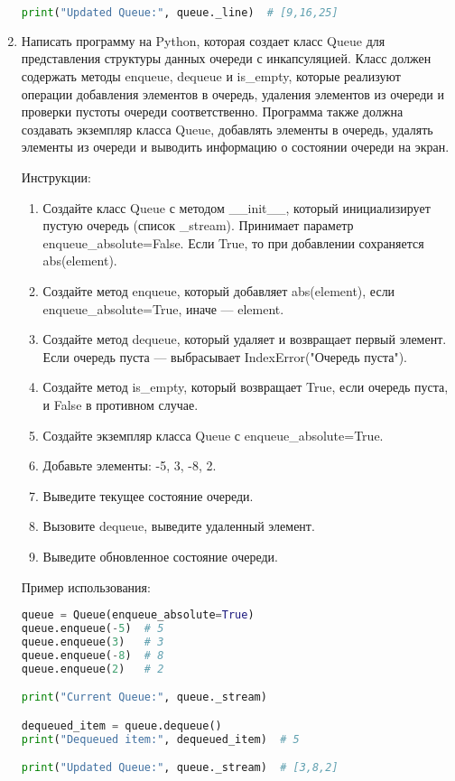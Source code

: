 \begin{enumerate}
\begin{lstlisting}[language=Python]
print("Updated Queue:", queue._line)  # [9,16,25]
\end{lstlisting}

\item Написать программу на Python, которая создает класс Queue для представления структуры данных очереди с инкапсуляцией. Класс должен содержать методы enqueue, dequeue и is\_empty, которые реализуют операции добавления элементов в очередь, удаления элементов из очереди и проверки пустоты очереди соответственно. Программа также должна создавать экземпляр класса Queue, добавлять элементы в очередь, удалять элементы из очереди и выводить информацию о состоянии очереди на экран.

Инструкции:
\begin{enumerate}
    \item Создайте класс Queue с методом \_\_init\_\_, который инициализирует пустую очередь (список \_stream). Принимает параметр enqueue\_absolute=False. Если True, то при добавлении сохраняется abs(element).
    \item Создайте метод enqueue, который добавляет abs(element), если enqueue\_absolute=True, иначе — element.
    \item Создайте метод dequeue, который удаляет и возвращает первый элемент. Если очередь пуста — выбрасывает IndexError("Очередь пуста").
    \item Создайте метод is\_empty, который возвращает True, если очередь пуста, и False в противном случае.
    \item Создайте экземпляр класса Queue с enqueue\_absolute=True.
    \item Добавьте элементы: -5, 3, -8, 2.
    \item Выведите текущее состояние очереди.
    \item Вызовите dequeue, выведите удаленный элемент.
    \item Выведите обновленное состояние очереди.
\end{enumerate}

Пример использования:
\begin{lstlisting}[language=Python]
queue = Queue(enqueue_absolute=True)
queue.enqueue(-5)  # 5
queue.enqueue(3)   # 3
queue.enqueue(-8)  # 8
queue.enqueue(2)   # 2

print("Current Queue:", queue._stream)

dequeued_item = queue.dequeue()
print("Dequeued item:", dequeued_item)  # 5

print("Updated Queue:", queue._stream)  # [3,8,2]
\end{lstlisting}


\end{enumerate}
